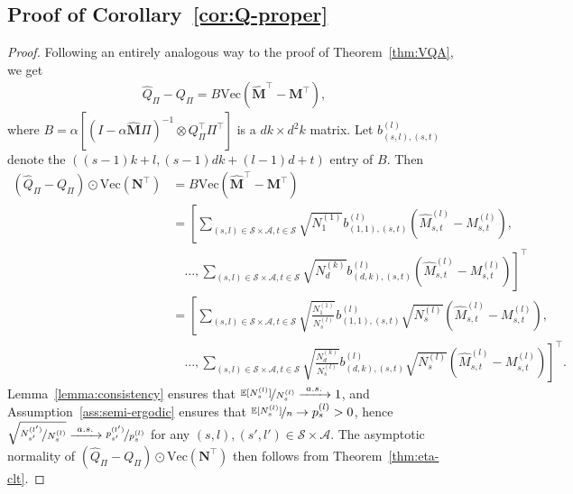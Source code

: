 \documentclass[twoside,11pt]{article}
\newcommand{\pow}[1]{^{(#1)}}%
\renewcommand{\Vec}[1]{\text{Vec}\lp #1\rp}
\numberwithin{equation}{section}
\newcommand{\lp}{\left(}
\newcommand{\rp}{\right)}
\newcommand{\expec}{\mathbb{E}}
\begin{document}
\subsection{Proof of Corollary~\ref{cor:Q-proper}}\label{sec:prf-Q-thm}
\begin{proof}
Following an entirely analogous way to the proof of Theorem~\ref{thm:VQA}, we get
\begin{align*}
    \hat Q_\Pi - Q_\Pi = B\Vec{\mathbf{\hat M}^\top - \mathbf{M}^\top},
\end{align*}
where $B=\alpha\left[\lp I-\alpha \mathbf{\hat M} \Pi \rp^{-1} \otimes  Q_\Pi^\top  \Pi^\top \right]$ is a $dk \times d^2k$ matrix.
Let $b_{(s,l),(s,t)}\pow l$ denote the $\lp (s-1)k+l, (s-1)dk+(l-1)d+t \rp$ entry of $B$.
Then
\begin{align*}
    \lp\hat Q_\Pi - Q_\Pi\rp \odot \Vec{\mathbf{N}^\top} &= B\Vec{\mathbf{\hat M}^\top - \mathbf{M}^\top} \\
    &=\left[\sum_{(s,l) \in \mathcal S \times \mathcal A, t \in \mathcal S} \sqrt{N_1 \pow 1} b_{(1,1), (s,t)} \pow l 
        \lp \hat M_{s,t} \pow l - M_{s,t} \pow l\rp, \right. \\
    &\quad \left. \ldots, \sum_{(s,l) \in \mathcal S \times \mathcal A, t \in \mathcal S} \sqrt{N_d \pow k} b_{(d,k), (s,t)} \pow l 
        \lp \hat M_{s,t} \pow l - M_{s,t} \pow l\rp\right]^\top \\
    &= \left[\sum_{(s,l) \in \mathcal S \times \mathcal A, t \in \mathcal S} \sqrt{\frac{N_1 \pow 1}{N_s \pow l}} b_{(1,1), (s,t)} \pow l 
        \sqrt{N_s \pow l} \lp \hat M_{s,t} \pow l - M_{s,t} \pow l\rp, \right. \\
    &\quad \left. \ldots, \sum_{(s,l) \in \mathcal S \times \mathcal A, t \in \mathcal S} \sqrt{\frac{N_d \pow k}{N_s \pow l}} b_{(d,k), (s,t)} \pow l 
        \sqrt{N_s \pow l}\lp \hat M_{s,t} \pow l - M_{s,t} \pow l\rp\right]^\top.
\end{align*}
Lemma~\ref{lemma:consistency} ensures that $\nicefrac{\expec[N_s \pow l]}{N_s \pow l} \xrightarrow{\ a.s. \ } 1$, and Assumption~\ref{ass:semi-ergodic} ensures that $\nicefrac{\expec[N_s \pow l]}{n} \rightarrow p_s \pow l > 0$, hence $\sqrt{\nicefrac{N_{s'} \pow {l'}}{N_s \pow l}} \xrightarrow{\ a.s. \ } \nicefrac{p_{s'} \pow {l'}}{p_s \pow l}$ for any $(s,l),(s',l') \in \mathcal S \times \mathcal A$.
The asymptotic normality of $\lp\hat Q_\Pi - Q_\Pi\rp \odot \Vec{\mathbf{N}^\top}$ then follows from Theorem~\ref{thm:eta-clt}.
\end{proof}
\end{document}
